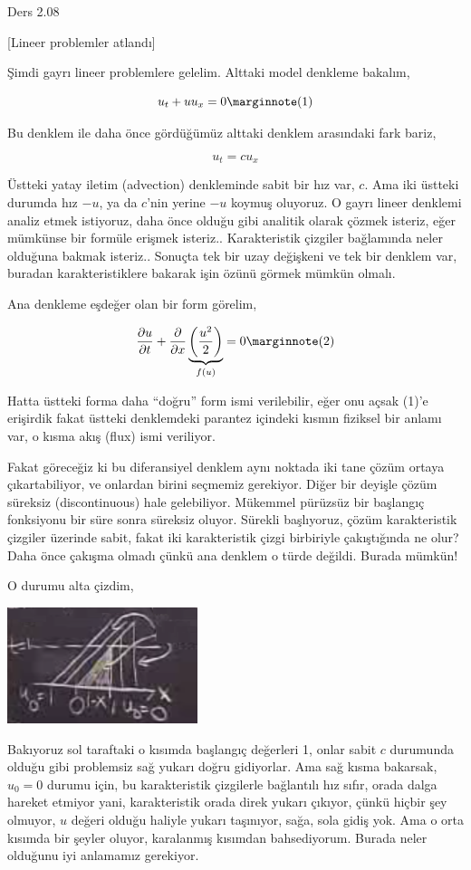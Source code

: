 \documentclass[12pt,fleqn]{article}\usepackage{../../common}
\begin{document}
Ders 2.08

[Lineer problemler atlandı]

Şimdi gayrı lineer problemlere gelelim. Alttaki model denkleme bakalım,

$$
u_t + u u_x = 0
\mlabel{1}
$$

Bu denklem ile daha önce gördüğümüz alttaki denklem arasındaki fark bariz,

$$
u_t = c u_x
$$

Üstteki yatay iletim (advection) denkleminde sabit bir hız var, $c$. Ama iki
üstteki durumda hız $-u$, ya da $c$'nin yerine $-u$ koymuş oluyoruz.  O gayrı
lineer denklemi analiz etmek istiyoruz, daha önce olduğu gibi analitik olarak
çözmek isteriz, eğer mümkünse bir formüle erişmek isteriz.. Karakteristik
çizgiler bağlamında neler olduğuna bakmak isteriz.. Sonuçta tek bir uzay
değişkeni ve tek bir denklem var, buradan karakteristiklere bakarak işin
özünü görmek mümkün olmalı.

Ana denkleme eşdeğer olan bir form görelim,

$$
\frac{\partial u}{\partial t} +
\frac{\partial }{\partial x}
\underbrace{ \left( \frac{u^2}{2} \right)}_{f(u)} = 0
\mlabel{2}
$$

Hatta üstteki forma daha ``doğru'' form ismi verilebilir, eğer onu açsak (1)'e
erişirdik fakat üstteki denklemdeki parantez içindeki kısmın fiziksel bir anlamı
var, o kısma akış (flux) ismi veriliyor.

Fakat göreceğiz ki bu diferansiyel denklem aynı noktada iki tane çözüm ortaya
çıkartabiliyor, ve onlardan birini seçmemiz gerekiyor. Diğer bir deyişle çözüm
süreksiz (discontinuous) hale gelebiliyor. Mükemmel pürüzsüz bir başlangıç
fonksiyonu bir süre sonra süreksiz oluyor. Sürekli başlıyoruz, çözüm
karakteristik çizgiler üzerinde sabit, fakat iki karakteristik çizgi birbiriyle
çakıştığında ne olur? Daha önce çakışma olmadı çünkü ana denklem o türde
değildi. Burada mümkün!

O durumu alta çizdim,

\includegraphics[width=15em]{compscieng_2_08_01.png}

Bakıyoruz sol taraftaki o kısımda başlangıç değerleri 1, onlar sabit $c$
durumunda olduğu gibi problemsiz sağ yukarı doğru gidiyorlar. Ama sağ kısma
bakarsak, $u_0=0$ durumu için, bu karakteristik çizgilerle bağlantılı hız
sıfır, orada dalga hareket etmiyor yani, karakteristik orada direk yukarı
çıkıyor, çünkü hiçbir şey olmuyor, $u$ değeri olduğu haliyle yukarı taşınıyor,
sağa, sola gidiş yok. Ama o orta kısımda bir şeyler oluyor, karalanmış
kısımdan bahsediyorum. Burada neler olduğunu iyi anlamamız gerekiyor.
\end{document}
